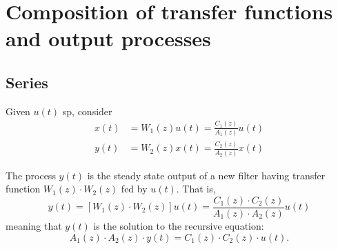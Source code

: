 
\section{Composition of transfer functions and output processes}
\subsection{Series}
Given $u(t)$ \gls{sp}, consider
\begin{align*}
	x(t)&=W_{1}(z)u(t)=\frac{C_{1}(z)}{A_{1}(z)}u(t)\\
	y(t)&=W_{2}(z)x(t)=\frac{C_{2}(z)}{A_{2}(z)}x(t)
\end{align*}
\begin{figure}[htpb]
	\centering
\end{figure}
\FloatBarrier

\begin{theorem}
	The process $y(t)$ is the steady state output of a new filter having transfer function $W_{1}(z)\cdot W_{2}(z)$ fed by $u(t)$. That is,
	\[
		y(t)=[W_{1}(z)\cdot W_{2}(z)]u(t)=\frac{C_{1}(z)\cdot C_{2}(z)}{A_{1}(z)\cdot A_{2}(z)}u(t)
	\]
	meaning that $y(t)$ is the solution to the recursive equation:
	\[
		A_{1}(z)\cdot A_{2}(z)\cdot y(t) = C_{1}(z)\cdot C_{2}(z)\cdot u(t).
	\]
\end{theorem}

